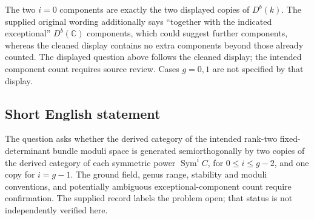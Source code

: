 \documentclass[11pt]{article}
\newcommand{\C}{\mathbb{C}}
\begin{document}
The two \(i=0\) components are exactly the two displayed copies of \(D^b(k)\). The supplied original wording additionally says ``together with the indicated exceptional'' \(D^b(\C)\) components, which could suggest further components, whereas the cleaned display contains no extra components beyond those already counted. The displayed question above follows the cleaned display; the intended component count requires source review. Cases \(g=0,1\) are not specified by that display.
\subsection{Short English statement}
The question asks whether the derived category of the intended rank-two fixed-determinant bundle moduli space is generated semiorthogonally by two copies of the derived category of each symmetric power \(\operatorname{Sym}^i C\), for \(0\leq i\leq g-2\), and one copy for \(i=g-1\). The ground field, genus range, stability and moduli conventions, and potentially ambiguous exceptional-component count require confirmation. The supplied record labels the problem open; that status is not independently verified here.
\end{document}
